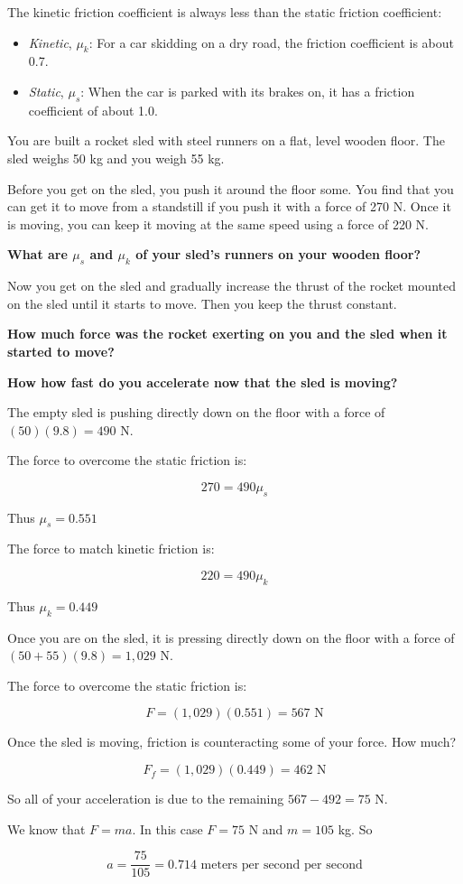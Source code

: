 The kinetic friction coefficient is always less than the static friction coefficient:
\begin{itemize}
\item \textit{Kinetic}, $\mu_k$: For a car skidding on a dry road,  the friction coefficient is about 0.7.  
\item \textit{Static}, $\mu_s$: When the car is parked with its brakes on,  it has a friction coefficient of about 1.0.
\end{itemize}

\begin{Exercise}[title={Rocket Sled},  label=rocketsled1]
  
You are built a rocket sled with steel runners on a flat, level wooden floor.   The sled weighs 50 kg and you weigh 55 kg.

Before you get on the sled,   you push it around the floor some.  You find that you can get it to move from a
standstill if you push it with a force of 270 N.   Once it is moving,  you can keep it moving at the same speed using a force of 220 N.

\textbf{What are $\mu_s$ and $\mu_k$  of your sled's runners on your wooden floor?}

Now you get on the sled and gradually increase the thrust of the rocket mounted on the sled until it starts to move.  Then you keep the thrust constant.

\textbf{How much force was the rocket exerting on you and the sled when it started to move?}

\textbf{How how fast do you accelerate now that the sled is moving?}

\end{Exercise}
\begin{Answer}[ref=rocketsled1]

The empty sled is pushing directly down on the floor with a force of $(50)(9.8) = 490$ N.

The force to overcome the static friction  is:

$$270 = 490 \mu_s$$

Thus $\mu_s = 0.551$

The force to match kinetic friction is:

$$220 = 490 \mu_k$$

Thus $\mu_k = 0.449$

Once you are on the sled,  it is pressing directly down on the floor with a force of $(50  + 55)(9.8) = 1,029$ N.

The force to overcome the static friction is:

$$F = (1,029)(0.551) = 567 \text{ N}$$

Once the sled is moving,  friction is counteracting some of your force.  How much?

$$F_f = (1,029)(0.449) = 462 \text{ N}$$

So all of your acceleration is due to the remaining $567 - 492 = 75$ N.

We know that $F = ma$.  In this case $F = 75$ N and $m = 105$ kg.  So

$$a = \frac{75}{105} = 0.714 \text{ meters per second per second}$$

\end{Answer}




